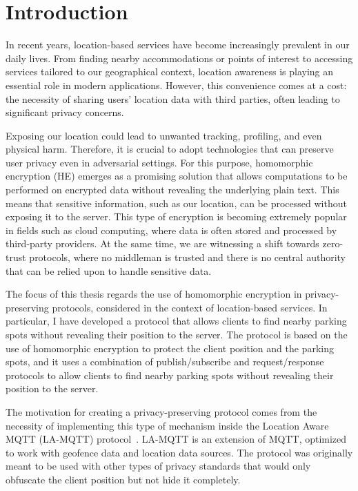 \chapter{Introduction} \label{chap:intro}

%
%

In recent years, location-based services have become increasingly prevalent in our daily lives. From finding nearby accommodations or points of interest to accessing services tailored to our geographical context, location awareness is playing an essential role in modern applications. However, this convenience comes at a cost: the necessity of sharing users' location data with third parties, often leading to significant privacy concerns.

Exposing our location could lead to unwanted tracking, profiling, and even physical harm. Therefore, it is crucial to adopt technologies that can preserve user privacy even in adversarial settings. For this purpose, homomorphic encryption (HE) emerges as a promising solution that allows computations to be performed on encrypted data without revealing the underlying plain text. This means that sensitive information, such as our location, can be processed without exposing it to the server. This type of encryption is becoming extremely popular in fields such as cloud computing, where data is often stored and processed by third-party providers. 
At the same time, we are witnessing a shift towards zero-trust protocols, where no middleman is trusted and there is no central authority that can be relied upon to handle sensitive data. 


The focus of this thesis regards the use of homomorphic encryption in privacy-preserving protocols, considered in the context of location-based services. In particular, I have developed a protocol that allows clients to find nearby parking spots without revealing their position to the server. The protocol is based on the use of homomorphic encryption to protect the client position and the parking spots, and it uses a combination of publish/subscribe and request/response protocols to allow clients to find nearby parking spots without revealing their position to the server.

The motivation for creating a privacy-preserving protocol comes from the necessity of implementing this type of mechanism inside the Location Aware MQTT (LA-MQTT) protocol~\cite{montori2022lamqtt}. LA-MQTT is an extension of MQTT, optimized to work with geofence data and location data sources. The protocol was originally meant to be used with other types of privacy standards that would only obfuscate the client position but not hide it completely.
